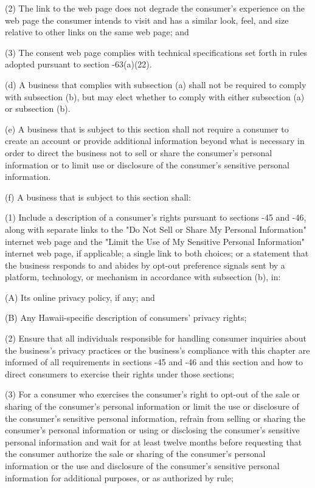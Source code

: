      (2)  The link to the web page does not degrade the consumer's experience on the web page the consumer intends to visit and has a similar look, feel, and size relative to other links on the same web page; and

     (3)  The consent web page complies with technical specifications set forth in rules adopted pursuant to section    -63(a)(22).

     (d)  A business that complies with subsection (a) shall not be required to comply with subsection (b), but may elect whether to comply with either subsection (a) or subsection (b).

     (e)  A business that is subject to this section shall not require a consumer to create an account or provide additional information beyond what is necessary in order to direct the business not to sell or share the consumer's personal information or to limit use or disclosure of the consumer's sensitive personal information.

     (f)  A business that is subject to this section shall:

     (1)  Include a description of a consumer's rights pursuant to sections    -45 and    -46, along with separate links to the "Do Not Sell or Share My Personal Information" internet web page and the "Limit the Use of My Sensitive Personal Information" internet web page, if applicable; a single link to both choices; or a statement that the business responds to and abides by opt-out preference signals sent by a platform, technology, or mechanism in accordance with subsection (b), in:

          (A)  Its online privacy policy, if any; and

          (B)  Any Hawaii-specific description of consumers' privacy rights;

     (2)  Ensure that all individuals responsible for handling consumer inquiries about the business's privacy practices or the business's compliance with this chapter are informed of all requirements in sections    -45 and    -46 and this section and how to direct consumers to exercise their rights under those sections;

     (3)  For a consumer who exercises the consumer's right to opt-out of the sale or sharing of the consumer's personal information or limit the use or disclosure of the consumer's sensitive personal information, refrain from selling or sharing the consumer's personal information or using or disclosing the consumer's sensitive personal information and wait for at least twelve months before requesting that the consumer authorize the sale or sharing of the consumer's personal information or the use and disclosure of the consumer's sensitive personal information for additional purposes, or as authorized by rule;

